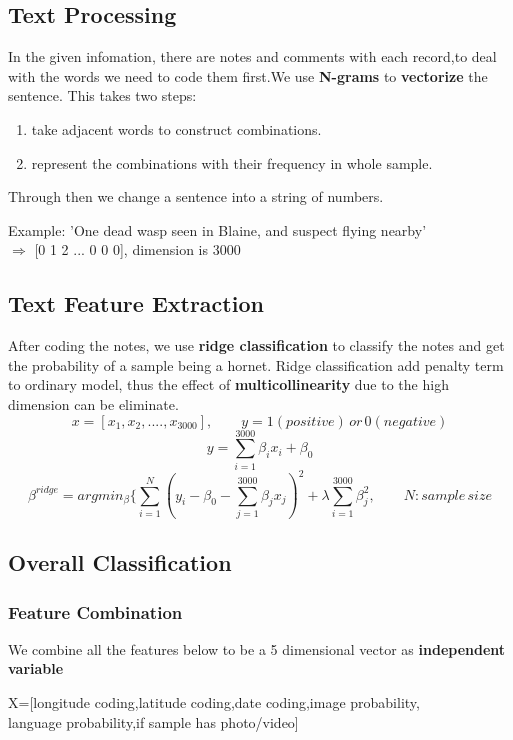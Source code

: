\documentclass[12pt]{article}
\begin{document}
\subsection{Text Processing}
In the given infomation, there are notes and comments with each record,to deal with the words we need to code them first.We use \textbf{N-grams} to \textbf{vectorize} the sentence. This takes two steps:
\begin{enumerate}
	\item take adjacent words to construct combinations.
	\item represent the combinations with their frequency in whole sample.
\end{enumerate}

Through then we change a sentence into a string of numbers.
\begin{center}
	Example: 'One dead wasp seen in Blaine, and suspect flying nearby'\\
	$\Rightarrow$ [0 1 2 ... 0 0 0], dimension is 3000
\end{center}
\subsection{Text Feature Extraction}
After coding the notes, we use \textbf{ridge classification} to classify the notes and get the probability of a sample being a hornet. Ridge classification add penalty term to ordinary model, thus the effect of \textbf{multicollinearity} due to the high dimension can be eliminate.
\begin{equation*}
x=[x_1,x_2,....,x_{3000}], \qquad y=1(positive)\,or\,0(negative)
\end{equation*}
\begin{equation}
y=\sum_{i=1}^{3000} \beta_i x_i+\beta_0
\end{equation}
\begin{equation}
\beta^{ridge}=argmin_{\beta}\lbrace \sum_{i=1}^{N}(y_i-\beta_0-\sum_{j=1}^{3000}\beta_j x_j)^2+\lambda\sum_{i=1}^{3000}\beta_j^2,\qquad N:sample\,size
\end{equation}

\subsection{Overall Classification}
\subsubsection{Feature Combination}
We combine all the features below to be a 5 dimensional vector as \textbf{independent variable}
\begin{center}
X=[longitude coding,latitude coding,date coding,image probability,\\language probability,if sample has photo/video]
\end{center}
\end{document}
